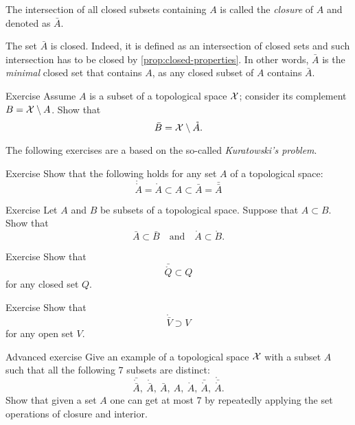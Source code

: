 The intersection of all closed subsets containing $A$ is called the \emph{closure} of $A$ and denoted as $\bar A$.

The set $\bar A$ is closed.
Indeed, it is defined as an intersection of closed sets and such intersection has to be closed by \ref{prop:closed-properties}.
In other words, $\bar A$ is the \textit{minimal} closed set that contains $A$, 
as any closed subset of $A$ contains $\bar A$.


\begin{thm}{Exercise}\label{ex:closure-interior-complement}
Assume $A$ is a subset of a topological space $\mathcal{X}$;
consider its complement $B=\mathcal{X}\setminus A$.
Show that 
\[\bar B=\mathcal{X}\setminus \mathring A.\]
\end{thm}

The following exercises are a based on the so-called \textit{Kuratowski's problem}.

\begin{thm}{Exercise}\label{ex:closure-closure}
Show that the following holds for any set $A$ of a topological space:
\[\mathring{\mathring A}=\mathring A\subset A\subset \bar A=\bar{\bar A}\]

\end{thm}

\begin{thm}{Exercise}\label{ex:kuratowski-c}
Let $A$ and $B$ be subsets of a topological space.
Suppose that $A\subset B$.
Show that 
\[\bar A\subset \bar B
\quad\text{and}\quad 
\mathring A\subset \mathring B.\]

\end{thm}

\begin{thm}{Exercise}\label{ex:kuratowski-closed}
Show that 
\[\bar{\mathring Q}\subset Q\]
for any closed set $Q$.
\end{thm}

\begin{thm}{Exercise}\label{ex:kuratowski-open}
Show that 
\[\mathring{\bar V}\supset V\]
for any open set $V$.
\end{thm}



\begin{thm}{Advanced exercise}\label{ex:kuratowski}
Give an example of a topological space $\mathcal{X}$ with a subset $A$ such that all the following 7 subsets are distinct:
\[\bar{\mathring{\bar A}},\ \mathring{\bar A},\ \bar A,\  A,\  \mathring A,\ \bar{\mathring A},\ \mathring{\bar{\mathring A}}.\]
Show that given a set $A$ one can get at most 7 by repeatedly applying the set operations of closure and interior.

\end{thm}


